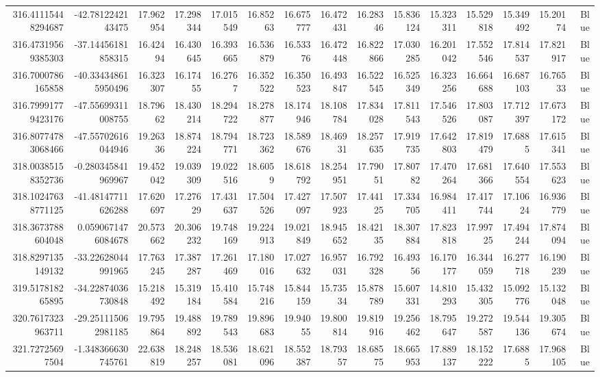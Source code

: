 \begin{center}
\begin{longtable}{rrrrrrrrrrrrrrr}
316.41115448294687 & -42.7812242143475 & 17.962954 & 17.298344 & 17.015549 & 16.85263 & 16.675777 & 16.472431 & 16.28346 & 15.836124 & 15.323311 & 15.529818 & 15.349492 & 15.20174 & Blue \\
316.47319569385303 & -37.14456181858315 & 16.42494 & 16.430645 & 16.393665 & 16.536879 & 16.53376 & 16.472448 & 16.822866 & 17.030285 & 16.201042 & 17.552546 & 17.814537 & 17.821917 & Blue \\
316.7000786165858 & -40.334348615950496 & 16.323307 & 16.17455 & 16.2767 & 16.352522 & 16.350523 & 16.493847 & 16.522545 & 16.525349 & 16.323256 & 16.664688 & 16.687103 & 16.76533 & Blue \\
316.79991779423176 & -47.55699311008755 & 18.79662 & 18.430214 & 18.294722 & 18.278877 & 18.174946 & 18.108784 & 17.834028 & 17.811543 & 17.546526 & 17.803087 & 17.712397 & 17.673172 & Blue \\
316.80774783068466 & -47.55702616044946 & 19.26336 & 18.874224 & 18.794771 & 18.723362 & 18.589676 & 18.46931 & 18.257635 & 17.919735 & 17.642803 & 17.819479 & 17.6885 & 17.615341 & Blue \\
318.00385158352736 & -0.280345841969967 & 19.452042 & 19.039309 & 19.022516 & 18.6059 & 18.618792 & 18.254951 & 17.79051 & 17.80782 & 17.470264 & 17.681366 & 17.640554 & 17.553623 & Blue \\
318.10247638771125 & -41.48147711626288 & 17.620697 & 17.27629 & 17.431637 & 17.504526 & 17.427097 & 17.507923 & 17.44125 & 17.334705 & 16.984411 & 17.417744 & 17.10624 & 16.936779 & Blue \\
318.3673788604048 & 0.0590671476084678 & 20.573662 & 20.306232 & 19.748169 & 19.224913 & 19.021849 & 18.945652 & 18.42135 & 18.307884 & 17.823818 & 17.99725 & 17.494244 & 17.874094 & Blue \\
318.8297135149132 & -33.22628044991965 & 17.763245 & 17.387287 & 17.261469 & 17.180016 & 17.027632 & 16.957031 & 16.792328 & 16.49356 & 16.170177 & 16.344059 & 16.277718 & 16.190239 & Blue \\
319.517818265895 & -34.22874036730848 & 15.218492 & 15.319184 & 15.410584 & 15.748216 & 15.844159 & 15.73534 & 15.878789 & 15.607331 & 14.810293 & 15.432305 & 15.092776 & 15.132048 & Blue \\
320.7617323963711 & -29.251115062981185 & 19.795864 & 19.488892 & 19.789543 & 19.896683 & 19.94055 & 19.800814 & 19.819916 & 19.256462 & 18.795647 & 19.272587 & 19.544136 & 19.305674 & Blue \\
321.72725697504 & -1.348366630745761 & 22.638819 & 18.248257 & 18.536081 & 18.621096 & 18.552387 & 18.79357 & 18.68575 & 18.665953 & 17.889137 & 18.152222 & 17.6885 & 17.968105 & Blue \\

\end{longtable}
\end{center}
